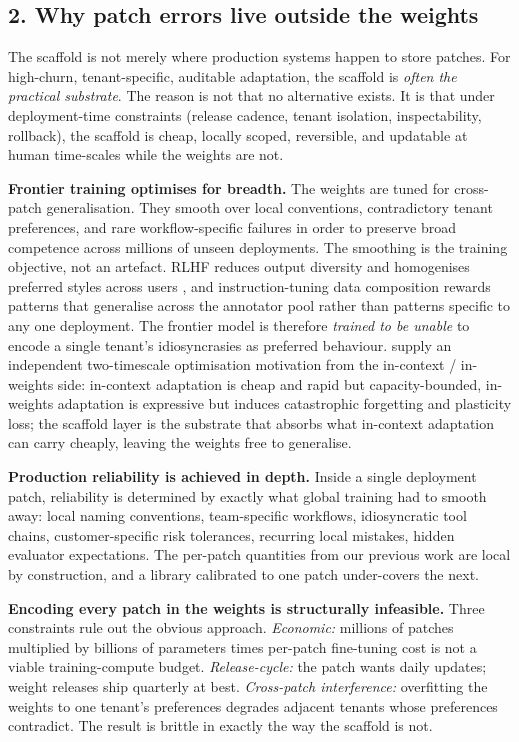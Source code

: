 \subsection{2. Why patch errors live outside the
weights}\label{why-patch-errors-live-outside-the-weights}

The scaffold is not merely where production systems happen to store
patches. For high-churn, tenant-specific, auditable adaptation, the
scaffold is \emph{often the practical substrate}. The reason is not that
no alternative exists. It is that under deployment-time constraints
(release cadence, tenant isolation, inspectability, rollback), the
scaffold is cheap, locally scoped, reversible, and updatable at human
time-scales while the weights are not.

\textbf{Frontier training optimises for breadth.} The weights are tuned
for cross-patch generalisation. They smooth over local conventions,
contradictory tenant preferences, and rare workflow-specific failures in
order to preserve broad competence across millions of unseen
deployments. The smoothing is the training objective, not an artefact.
RLHF reduces output diversity and homogenises preferred styles across
users \citep{kirk2024understanding, padmakumar2023diversity}, and
instruction-tuning data composition rewards patterns that generalise
across the annotator pool rather than patterns specific to any one
deployment. The frontier model is therefore \emph{trained to be unable}
to encode a single tenant's idiosyncrasies as preferred behaviour.
\citet{tiwari2026fastandslow} supply an independent two-timescale
optimisation motivation from the in-context / in-weights side:
in-context adaptation is cheap and rapid but capacity-bounded,
in-weights adaptation is expressive but induces catastrophic forgetting
and plasticity loss; the scaffold layer is the substrate that absorbs
what in-context adaptation can carry cheaply, leaving the weights free
to generalise.

\textbf{Production reliability is achieved in depth.} Inside a single
deployment patch, reliability is determined by exactly what global
training had to smooth away: local naming conventions, team-specific
workflows, idiosyncratic tool chains, customer-specific risk tolerances,
recurring local mistakes, hidden evaluator expectations. The per-patch
quantities from our previous work are local by construction, and a
library calibrated to one patch under-covers the next.

\textbf{Encoding every patch in the weights is structurally infeasible.}
Three constraints rule out the obvious approach. \emph{Economic:}
millions of patches multiplied by billions of parameters times per-patch
fine-tuning cost is not a viable training-compute budget.
\emph{Release-cycle:} the patch wants daily updates; weight releases
ship quarterly at best. \emph{Cross-patch interference:} overfitting the
weights to one tenant's preferences degrades adjacent tenants whose
preferences contradict. The result is brittle in exactly the way the
scaffold is not.

